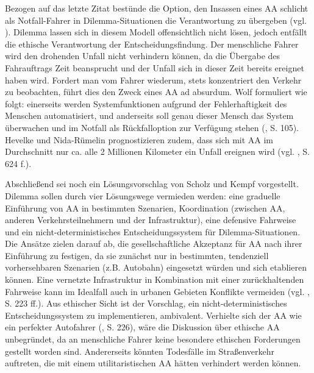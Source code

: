 \documentclass[a4paper, 12pt, titlepage]{scrartcl}
\begin{document}
	Bezogen auf das letzte Zitat best\"unde die Option, den Insassen eines AA schlicht als \glqq Notfall-Fahrer\grqq{} in Dilemma-Situationen die Verantwortung zu \"ubergeben (vgl. \autocite{Lin2015}). Dilemma lassen sich in diesem Modell offensichtlich nicht l\"osen, jedoch entf\"allt die ethische Verantwortung der Entscheidungsfindung. Der menschliche Fahrer wird den drohenden Unfall nicht verhindern k\"onnen, da die \"Ubergabe des Fahrauftrags Zeit beansprucht und der Unfall sich in dieser Zeit bereits ereignet haben wird. Fordert man vom Fahrer wiederum, stets konzentriert den Verkehr zu beobachten, f\"uhrt dies den Zweck eines AA ad absurdum. Wolf \autocite{Wolf2015} formuliert wie folgt: \glqq einerseits werden Systemfunktionen aufgrund der Fehlerhaftigkeit des Menschen automatisiert, und anderseits soll genau dieser Mensch das System überwachen und im Notfall als Rückfalloption zur Verfügung stehen\grqq{} (\autocite{Wolf2015}, S. 105). Hevelke und Nida-R{\"u}melin \autocite{Hevelke2015} prognostizieren zudem, dass sich mit AA im Durchschnitt nur ca. alle 2 Millionen Kilometer ein Unfall ereignen wird (vgl. \autocite{Hevelke2015}, S. 624 f.). 
	
	Abschlie\ss end sei noch ein L\"osungsvorschlag von Scholz und Kempf \autocite{Scholz2016} vorgestellt. Dilemma sollen durch vier L\"osungswege vermieden werden: eine graduelle Einf\"uhrung von AA in bestimmten Szenarien, Koordination (zwischen AA, anderen Verkehrsteilnehmern und der Infrastruktur), eine defensive Fahrweise und ein nicht-deterministisches Entscheidungssystem f\"ur Dilemma-Situationen. Die Ans\"atze zielen darauf ab, die gesellschaftliche Akzeptanz f\"ur AA nach ihrer Einf\"uhrung zu festigen, da sie zun\"achst nur in bestimmten, tendenziell vorhersehbaren Szenarien (z.B. Autobahn) eingesetzt w\"urden und sich etablieren k\"onnen. Eine vernetzte Infrastruktur in Kombination mit einer zur\"uckhaltenden Fahrweise kann im Idealfall auch in urbanen Gebieten Konflikte vermeiden (vgl. \autocite{Scholz2016}, S. 223 ff.). Aus ethischer Sicht ist der Vorschlag, ein nicht-deterministisches Entscheidungssystem zu implementieren, ambivalent. Verhielte sich der AA \glqq wie ein perfekter Autofahrer\grqq{} (\autocite{Scholz2016}, S. 226), w\"are die Diskussion \"uber ethische AA unbegr\"undet, da an menschliche Fahrer keine besondere ethischen Forderungen gestellt worden sind. Andererseits k\"onnten Todesf\"alle im Stra\ss enverkehr auftreten, die mit einem utilitaristischen AA h\"atten verhindert werden k\"onnen. 
\end{document}
